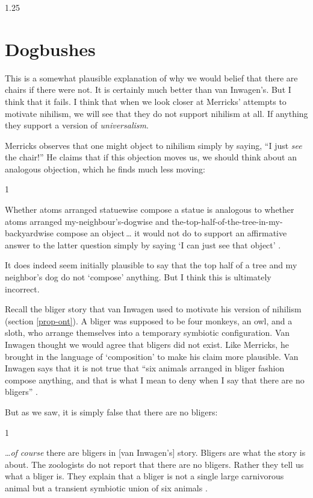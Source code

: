 \documentclass[11pt]{article}
\newenvironment{squote}{%
\begin{spacing}{1}
       	\begin{list}{}{%
\setlength{\labelwidth}{0pt}%
\rightmargin\leftmargin%
}
\item\relax
}{%
\end{list}%
\end{spacing}
}
\begin{document}
\begin{spacing}{1.25}
\section{Dogbushes}
\label{dogbush}
This is a somewhat plausible explanation of why we would belief that
there are chairs if there were not.  It is certainly much better than
van Inwagen's.  But I think that it fails.  I think that when we look
closer at Merricks' attempts to motivate nihilism, we will see that
they do not support nihilism at all.  If anything they support a
version of {\em universalism}.

Merricks observes that one might object to nihilism simply by saying,
``I just {\em see} the chair!''  He claims that if this objection
moves us, we should think about an analogous objection, which he finds
much less moving:

\begin{squote}
Whether atoms arranged statuewise compose a statue is analogous to
whether atoms arranged my-neighbour's-dogwise and
the-top-half-of-the-tree-in-my-backyardwise compose an object\,\ldots
it would not do to support an affirmative answer to the latter
question simply by saying `I can just see that object'
\citeyearpar[73]{merricks2001a}.
\end{squote}

It does indeed seem initially plausible to say that the top half of a
tree and my neighbor's dog do not `compose' anything.  But I think
this is ultimately incorrect.

Recall the bliger story that van Inwagen used to motivate his version
of nihilism (section \ref{prop-ont}).  A bliger was supposed to be
four monkeys, an owl, and a sloth, who arrange themselves into a
temporary symbiotic configuration.  Van Inwagen thought we would agree
that bligers did not exist.  Like Merricks, he brought in the language
of `composition' to make his claim more plausible.  Van Inwagen says
that it is not true that ``six animals arranged in bliger fashion
compose anything, and that is what I mean to deny when I say that
there are no bligers'' \citeyearpar[104]{inwagen1995}.

But as we saw, it is simply false that there are no bligers:

\begin{squote}
\ldots {\em of course} there are bligers in [van Inwagen's] story.
Bligers are what the story is about.  The zoologists do not report
that there are no bligers.  Rather they tell us what a bliger is.
They explain that a bliger is not a single large carnivorous animal
but a transient symbiotic union of six animals
\citep[704]{rosenberg1993}.
\end{squote}


\end{spacing}
\end{document}

